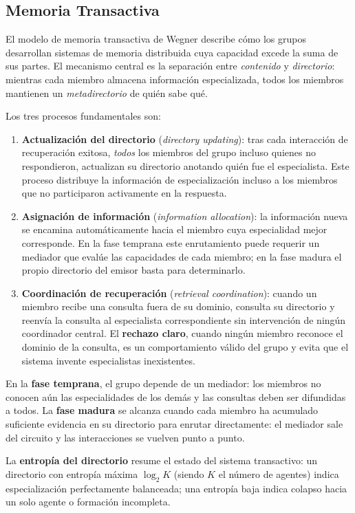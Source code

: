 \subsection{Memoria Transactiva}
\label{sec:tmt}

El modelo de memoria transactiva de Wegner \cite{wegner1987transactive} describe cómo
los grupos desarrollan sistemas de memoria distribuida cuya capacidad excede la suma
de sus partes.
El mecanismo central es la separación entre \emph{contenido} y \emph{directorio}:
mientras cada miembro almacena información especializada, todos los miembros mantienen
un \emph{metadirectorio} de quién sabe qué.

Los tres procesos fundamentales son:

\begin{enumerate}
    \item \textbf{Actualización del directorio} (\emph{directory updating}):
    tras cada interacción de recuperación exitosa, \emph{todos} los miembros del grupo
    incluso quienes no respondieron, actualizan su directorio anotando quién
    fue el especialista.
    Este proceso distribuye la información de especialización incluso a los miembros que
    no participaron activamente en la respuesta.

    \item \textbf{Asignación de información} (\emph{information allocation}):
    la información nueva se encamina automáticamente hacia el miembro cuya especialidad
    mejor corresponde.
    En la fase temprana este enrutamiento puede requerir un mediador que evalúe las
    capacidades de cada miembro; en la fase madura el propio directorio del emisor
    basta para determinarlo.

    \item \textbf{Coordinación de recuperación} (\emph{retrieval coordination}):
    cuando un miembro recibe una consulta fuera de su dominio, consulta su directorio
    y reenvía la consulta al especialista correspondiente sin intervención de ningún
    coordinador central.
    El \textbf{rechazo claro}, cuando ningún miembro reconoce el dominio de la
    consulta, es un comportamiento válido del grupo y evita que el sistema invente
    especialistas inexistentes.
\end{enumerate}

En la \textbf{fase temprana}, el grupo depende de un mediador: los miembros
no conocen aún las especialidades de los demás y las consultas deben ser difundidas a
todos.
La \textbf{fase madura} se alcanza cuando cada miembro ha acumulado suficiente evidencia
en su directorio para enrutar directamente: el mediador sale del circuito y las
interacciones se vuelven punto a punto.

La \textbf{entropía del directorio} resume el estado del sistema transactivo:
un directorio con entropía máxima $\log_2 K$ (siendo $K$ el número de agentes)
indica especialización perfectamente balanceada; una entropía baja indica colapso hacia
un solo agente o formación incompleta.
